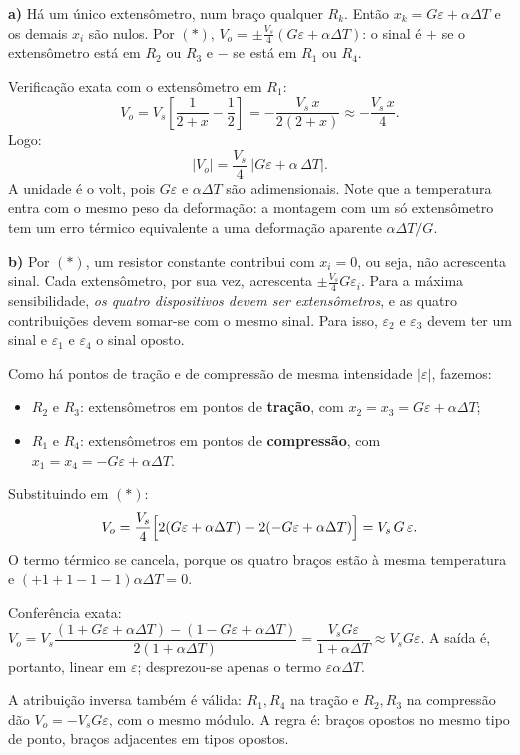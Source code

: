 \documentclass{article}%
\begin{document}
\textbf{a)} Há um único extensômetro, num braço qualquer $R_k$. Então $x_k=G\varepsilon+\alpha\Delta T$ e os demais $x_i$ são nulos. Por $(\ast)$, $V_o=\pm\frac{V_s}{4}(G\varepsilon+\alpha\Delta T)$: o sinal é $+$ se o extensômetro está em $R_2$ ou $R_3$ e $-$ se está em $R_1$ ou $R_4$.

Verificação exata com o extensômetro em $R_1$:
\[
V_o=V_s\left[\frac{1}{2+x}-\frac12\right]=-\frac{V_s\,x}{2(2+x)}\approx-\frac{V_s\,x}{4}.
\]
Logo:
\[
|V_o|=\frac{V_s}{4}\,\bigl|G\varepsilon+\alpha\,\Delta T\bigr|.
\]
A unidade é o volt, pois $G\varepsilon$ e $\alpha\Delta T$ são adimensionais. Note que a temperatura entra com o mesmo peso da deformação: a montagem com um só extensômetro tem um erro térmico equivalente a uma deformação aparente $\alpha\Delta T/G$.

\textbf{b)} Por $(\ast)$, um resistor constante contribui com $x_i=0$, ou seja, não acrescenta sinal. Cada extensômetro, por sua vez, acrescenta $\pm\frac{V_s}{4}G\varepsilon_i$. Para a máxima sensibilidade, \emph{os quatro dispositivos devem ser extensômetros}, e as quatro contribuições devem somar-se com o mesmo sinal. Para isso, $\varepsilon_2$ e $\varepsilon_3$ devem ter um sinal e $\varepsilon_1$ e $\varepsilon_4$ o sinal oposto.

Como há pontos de tração e de compressão de mesma intensidade $|\varepsilon|$, fazemos:
\begin{itemize}
\item $R_2$ e $R_3$: extensômetros em pontos de \textbf{tração}, com $x_2=x_3=G\varepsilon+\alpha\Delta T$;
\item $R_1$ e $R_4$: extensômetros em pontos de \textbf{compressão}, com $x_1=x_4=-G\varepsilon+\alpha\Delta T$.
\end{itemize}
Substituindo em $(\ast)$:
\[
V_o=\frac{V_s}{4}\Bigl[2(G\varepsilon+\alpha\Delta T)-2(-G\varepsilon+\alpha\Delta T)\Bigr]=V_s\,G\,\varepsilon .
\]
O termo térmico se cancela, porque os quatro braços estão à mesma temperatura e $(+1+1-1-1)\alpha\Delta T=0$.

Conferência exata: $V_o=V_s\dfrac{(1+G\varepsilon+\alpha\Delta T)-(1-G\varepsilon+\alpha\Delta T)}{2(1+\alpha\Delta T)}=\dfrac{V_sG\varepsilon}{1+\alpha\Delta T}\approx V_sG\varepsilon$. A saída é, portanto, linear em $\varepsilon$; desprezou-se apenas o termo $\varepsilon\alpha\Delta T$.

A atribuição inversa também é válida: $R_1,R_4$ na tração e $R_2,R_3$ na compressão dão $V_o=-V_sG\varepsilon$, com o mesmo módulo. A regra é: braços opostos no mesmo tipo de ponto, braços adjacentes em tipos opostos.
\end{document}
